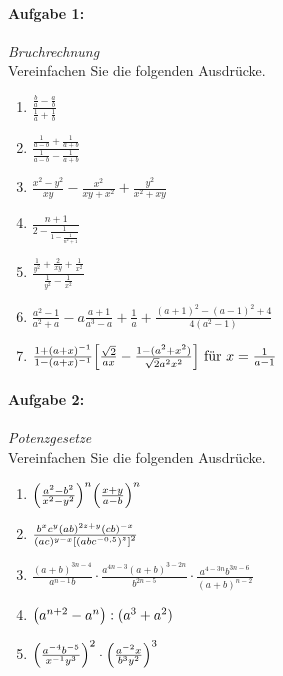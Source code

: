 
\paragraph{Aufgabe 1: } \emph{Bruchrechnung}\\[0.2cm]
Vereinfachen Sie die folgenden Ausdrücke.

\begin{enumerate}[label=(\alph*)]
    \item $\frac{\frac{b}{a}-\frac{a}{b}}{\frac{1}{a}+\frac{1}{b}}$
    \item $\frac{\frac{1}{a-b}+\frac{1}{a+b}}{\frac{1}{a-b}-\frac{1}{a+b}}$
    \item $\frac{x^2-y^2}{xy}-\frac{x^2}{xy+x^2}+\frac{y^2}{x^2+xy}$
    \item $\frac{n+1}{2-\frac{1}{1-\frac{1}{n^2+1}}}$
    \item $\frac{\frac{1}{y^2}+\frac{2}{xy}+\frac{1}{x^2}}{\frac{1}{y^2}-\frac{1}{x^2}}$
    \item $\frac{a^2-1}{a^2+a}-a\frac{a+1}{a^3-a}+\frac{1}{a}+\frac{(a+1)^2-(a-1)^2+4}{4(a^2-1)}$
    \item $\frac{1+(a+x)^{-1}}{1-(a+x)^{-1}}\qty[\frac{\sqrt{2}}{ax}-\frac{1-(a^2+x^2)}{\sqrt{2}a^2x^2}] \text{ für } x=\frac{1}{a-1}$
\end{enumerate}

\paragraph{Aufgabe 2: } \emph{Potenzgesetze}\\[0.2cm]
Vereinfachen Sie die folgenden Ausdrücke.

\begin{enumerate}[label=(\alph*)]
    \item $\qty(\frac{a^2-b^2}{x^2-y^2})^n\qty(\frac{x+y}{a-b})^n$
    \item $\frac{b^xc^y(ab)^{2z+y}(cb)^{-x}}{(ac)^{y-x}\qty[\qty(abc^{-0,5})^z]^2}$
    \item $\frac{(a+b)^{3n-4}}{a^{n-1}b}\cdot\frac{a^{4n-3}(a+b)^{3-2n}}{b^{2n-5}}\cdot\frac{a^{4-3n}b^{3n-6}}{(a+b)^{n-2}}$
    \item $\qty(a^{n+2}-a^n):(a^3+a^2)$
    \item $\qty(\frac{a^{-4}b^{-5}}{x^{-1}y^3})^2\cdot\qty(\frac{a^{-2}x}{b^3y^2})^3$
\end{enumerate}
%
